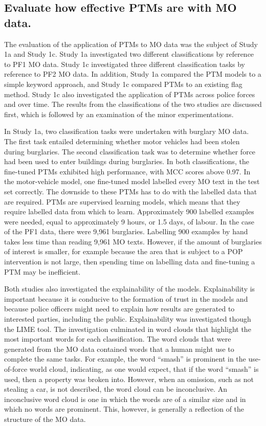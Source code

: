 \subsection{Evaluate how effective PTMs are with MO data.} The evaluation of the application of PTMs to MO data was the subject of Study 1a and Study 1c. Study 1a investigated two different classifications by reference to PF1 MO data. Study 1c investigated three different classification tasks by reference to PF2 MO data. In addition, Study 1a compared the PTM models to a simple keyword approach, and Study 1c compared PTMs to an existing flag method. Study 1c also investigated the application of PTMs across police forces and over time. The results from the classifications of the two studies are discussed first, which is followed by an examination of the minor experimentations.

In Study 1a, two classification tasks were undertaken with burglary MO data. The first task entailed determining whether motor vehicles had been stolen during burglaries. The second classification task was to determine whether force had been used to enter buildings during burglaries. In both classifications, the fine-tuned PTMs exhibited high performance, with MCC scores above 0.97. In the motor-vehicle model, one fine-tuned model labelled every MO text in the test set correctly. The downside to these PTMs has to do with the labelled data that are required. PTMs are supervised learning models, which means that they require labelled data from which to learn. Approximately 900 labelled examples were needed, equal to approximately 9 hours, or 1.5 days, of labour. In the case of the PF1 data, there were 9,961 burglaries. Labelling 900 examples by hand takes less time than reading 9,961 MO texts. However, if the amount of burglaries of interest is smaller, for example because the area that is subject to a POP intervention is not large, then spending time on labelling data and fine-tuning a PTM may be inefficient.

Both studies also investigated the explainability of the models. Explainability is important because it is conducive to the formation of trust in the models and because police officers might need to explain how results are generated to interested parties, including the public. Explainability was investigated though the LIME tool. The investigation culminated in word clouds that highlight the most important words for each classification. The word clouds that were generated from the MO data contained words that a human might use to complete the same tasks. For example, the word “smash” is prominent in the use-of-force world cloud, indicating, as one would expect, that if the word “smash” is used, then a property was broken into. However, when an omission, such as not stealing a car, is not described, the word cloud can be inconclusive. An inconclusive word cloud is one in which the words are of a similar size and in which no words are prominent. This, however, is generally a reflection of the structure of the MO data.

